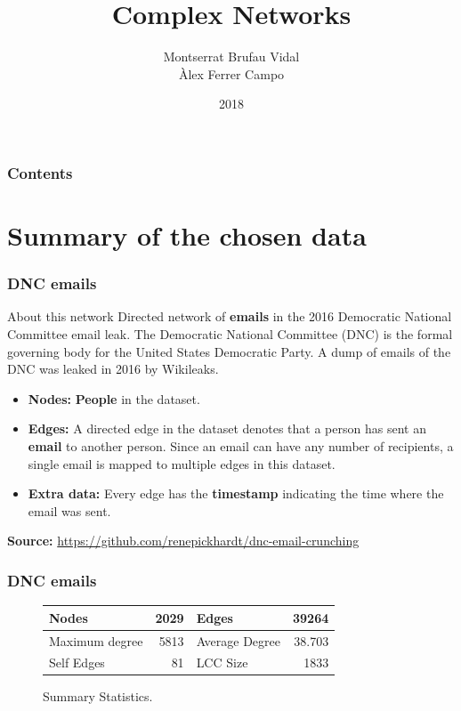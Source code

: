 \documentclass{beamer}
\title[]{Complex Networks}
\author[]{Montserrat Brufau Vidal\\ Àlex Ferrer Campo}
\institute[]{Universitat de Barcelona}
\date{2018}
\theoremstyle{plain}
\theoremstyle{definition}
\theoremstyle{remark}
\begin{document}
\begin{frame}
\titlepage
\end{frame}

\begin{frame}
\frametitle{Contents}
\tableofcontents
\end{frame}


\section{Summary of the chosen data}


\begin{frame}
\frametitle{DNC emails}
\begin{block}{About this network}
	Directed network of \textbf{emails} in the 2016 Democratic National Committee email leak. The Democratic National Committee (DNC) is the formal governing body for the United States Democratic Party. A dump of emails of the DNC was leaked in 2016 by Wikileaks. 
\end{block}
\pause
\begin{itemize}
	\item \textbf{Nodes:} \textbf{People} in the dataset.
	\pause
	\item \textbf{Edges:} A directed edge in the dataset denotes that a person has sent an \textbf{email} to another person. Since an email can have any number of recipients, a single email is mapped to multiple edges in this dataset.
	\pause
	\item \textbf{Extra data:} Every edge has the \textbf{timestamp} indicating the time where the email was sent.
\end{itemize}
\textbf{Source:} \href{https://github.com/renepickhardt/dnc-email-crunching}{https://github.com/renepickhardt/dnc-email-crunching}

\end{frame}


\begin{frame}
\frametitle{DNC emails}
\begin{figure}
    \centering
    \begin{tabular}{| l | r | l | r |} 
 \hline
 Nodes & 2029 & Edges & 39264\\
 \hline
 Maximum degree	& 5813 & Average Degree & 38.703\\
 \hline
 Self Edges & 81 & LCC Size & 1833\\
 \hline
\end{tabular}
    \caption{Summary Statistics.}
    \label{fig:my_label}
\end{figure}
\end{frame}
\end{document}
